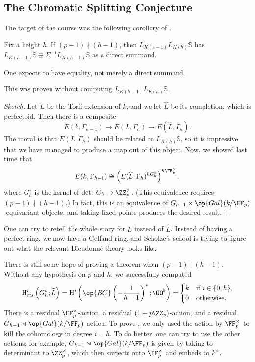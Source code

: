 \documentclass[../notes.tex]{subfiles}
\begin{document}
\subsection{The Chromatic Splitting Conjecture}
The target of the course was the following corollary of .
\begin{theorem} \label{thm:target}
	Fix a height $h$. If $(p-1)\nmid(h-1)$, then $L_{K(h-1)}L_{K(h)}\mathbb S$ has $L_{K(h-1)}\mathbb S\oplus\Sigma^{-1}L_{K(h-1)}\mathbb S$ as a direct summand.
\end{theorem}
\begin{remark}
	One expects to have equality, not merely a direct summand.
\end{remark}
\begin{remark}
	This was proven without computing $L_{K(h-1)}L_{K(h)}\mathbb S$.
\end{remark}
\begin{proof}[Sketch]
	Let $L$ be the Torii extension of $k$, and we let $\widehat L$ be its completion, which is perfectoid. Then there is a composite
	\[E(k,\Gamma_{h-1})\to E(L,\Gamma_h)\to E(\widehat L,\Gamma_h).\]
	The moral is that $E(L,\Gamma_h)$ should be related to $L_{K(h)}\mathbb S$, so it is impressive that we have managed to produce a map out of this object. Now, we showed last time that
	\[E(k,\Gamma_{h-1})\cong\left(E(\widehat L,\Gamma_h)^{hG_h^\circ}\right)^{h\FF_p^\times},\]
	where $G_h^\circ$ is the kernel of $\det\colon G_h\to\ZZ_p^\times$. (This equivalence requires $(p-1)\nmid(h-1)$.) In fact, this is an equivalence of $G_{h-1}\rtimes\op{Gal}(k/\FF_p)$-equivariant objects, and taking fixed points produces the desired result.
\end{proof}\begin{remark}
	One can try to retell the whole story for $L$ instead of $\widehat L$. Instead of having a perfect ring, we now have a Gelfand ring, and Scholze's school is trying to figure out what the relevant Dieudonn\'e theory looks like.
\end{remark}
There is still some hope of proving a theorem when $(p-1)\mid(h-1)$. Without any hypothesis on $p$ and $h$, we successfully computed
\[\mathrm H^i_{\mathrm{cts}}\left(G_h^\circ;\widehat L\right)=\mathrm H^i\left(\op{BC}\left(-\frac{1}{h-1}\right)^*;\OO^\flat\right)=\begin{cases}
	k & \text{if }i\in\{0,h\}, \\
	0 & \text{otherwise}.
\end{cases}\]
There is a residual $\FF_p^\times$-action, a residual $(1+p\ZZ_p)$-action, and a residual $G_{h-1}\rtimes\op{Gal}(k/\FF_p)$-action. To prove , we only used the action by $\FF_p^\times$ to kill the cohomology in degree $i=h$. To do better, one can try to use the other actions; for example, $G_{h-1}\rtimes\op{Gal}(k/\FF_p)$ is given by taking to determinant to $\ZZ_p^\times$, which then surjects onto $\FF_p^\times$ and embeds to $k^\times$.
\end{document}
